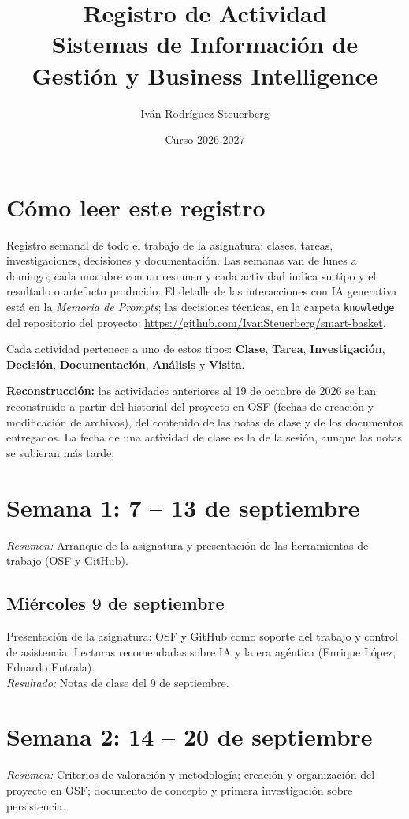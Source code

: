 \documentclass[11pt,a4paper]{article}
\title{Registro de Actividad \\ \large Sistemas de Información de Gestión y Business Intelligence}
\author{Iván Rodríguez Steuerberg}
\date{Curso 2026-2027}
\newcommand{\actividad}[3]{\item[\textbf{[#1]}] #2 \\ \textit{Resultado:} #3}
\begin{document}
	\maketitle

	\section*{Cómo leer este registro}
	Registro semanal de todo el trabajo de la asignatura: clases, tareas, investigaciones, decisiones y documentación. Las semanas van de lunes a domingo; cada una abre con un resumen y cada actividad indica su tipo y el resultado o artefacto producido. El detalle de las interacciones con IA generativa está en la \textit{Memoria de Prompts}; las decisiones técnicas, en la carpeta \texttt{knowledge} del repositorio del proyecto: \url{https://github.com/IvanSteuerberg/smart-basket}.

	Cada actividad pertenece a uno de estos tipos: \textbf{Clase}, \textbf{Tarea}, \textbf{Investigación}, \textbf{Decisión}, \textbf{Documentación}, \textbf{Análisis} y \textbf{Visita}.

	\textbf{Reconstrucción:} las actividades anteriores al 19 de octubre de 2026 se han reconstruido a partir del historial del proyecto en OSF (fechas de creación y modificación de archivos), del contenido de las notas de clase y de los documentos entregados. La fecha de una actividad de clase es la de la sesión, aunque las notas se subieran más tarde.


	\section*{Semana 1: 7 -- 13 de septiembre}
	\textit{Resumen:} Arranque de la asignatura y presentación de las herramientas de trabajo (OSF y GitHub).
	
	\subsection*{Miércoles 9 de septiembre}
	\begin{description}[leftmargin=0pt, itemsep=6pt]
		\actividad{Clase}{Presentación de la asignatura: OSF y GitHub como soporte del trabajo y control de asistencia. Lecturas recomendadas sobre IA y la era agéntica (Enrique López, Eduardo Entrala).}{Notas de clase del 9 de septiembre.}
	\end{description}

	\section*{Semana 2: 14 -- 20 de septiembre}
	\textit{Resumen:} Criterios de valoración y metodología; creación y organización del proyecto en OSF; documento de concepto y primera investigación sobre persistencia.
	
\end{document}

